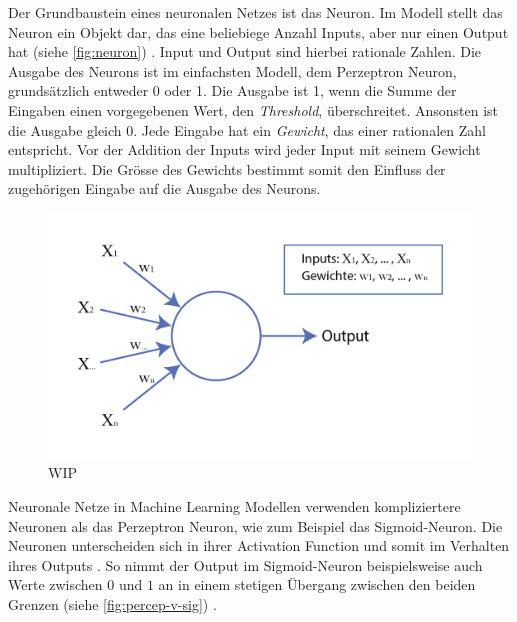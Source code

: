 Der Grundbaustein eines neuronalen Netzes ist das Neuron. Im Modell stellt das
Neuron ein Objekt dar, das eine beliebiege Anzahl Inputs, aber nur einen Output
hat (siehe \autoref{fig:neuron}) \cite{pramoditha_concept_2021}. Input und Output
sind hierbei rationale Zahlen. Die Ausgabe des Neurons ist im einfachsten
Modell, dem Perzeptron Neuron, grundsätzlich entweder 0 oder 1. Die Ausgabe ist
1, wenn die Summe der Eingaben einen vorgegebenen Wert, den \emph{Threshold},
überschreitet. Ansonsten ist die Ausgabe gleich 0. Jede Eingabe hat ein
\emph{Gewicht}, das einer rationalen Zahl entspricht. Vor der Addition der
Inputs wird jeder Input mit seinem Gewicht multipliziert.  Die Grösse des
Gewichts bestimmt somit den Einfluss der zugehörigen Eingabe auf die Ausgabe des
Neurons. \cite{nielsen_neural_2015}\cite{simplilearn_what_2021}

\begin{figure}[!ht]
    \centering
    \includegraphics[width=\textwidth]{images/theorie/neuron.png}
    \caption{WIP}
    \label{fig:neuron}
\end{figure}

Neuronale Netze in Machine Learning Modellen verwenden kompliziertere Neuronen
als das Perzeptron Neuron, wie zum Beispiel das Sigmoid-Neuron. Die Neuronen
unterscheiden sich in ihrer Activation Function und somit im Verhalten ihres
Outputs \cite{pragati_baheti_activation_2022}. So nimmt der Output im Sigmoid-Neuron
beispielsweise auch Werte zwischen $0$ und $1$ an in einem stetigen Übergang
zwischen den beiden Grenzen (siehe \autoref{fig:percep-v-sig}) \cite{kumar_sigmoid_2019}.

